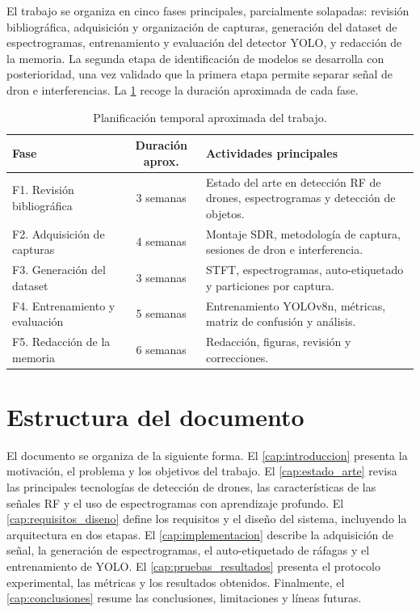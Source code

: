 El trabajo se organiza en cinco fases principales, parcialmente solapadas: revisión bibliográfica, adquisición y organización de capturas, generación del dataset de espectrogramas, entrenamiento y evaluación del detector YOLO, y redacción de la memoria. La segunda etapa de identificación de modelos se desarrolla con posterioridad, una vez validado que la primera etapa permite separar señal de dron e interferencias. La \cref{tab:planificacion} recoge la duración aproximada de cada fase.

\begin{table}[htbp]
\centering
\caption{Planificación temporal aproximada del trabajo.}
\label{tab:planificacion}
\begin{tabularx}{\textwidth}{lcX}
\toprule
\textbf{Fase} & \textbf{Duración aprox.} & \textbf{Actividades principales} \\
\midrule
F1. Revisión bibliográfica & 3 semanas & Estado del arte en detección RF de drones, espectrogramas y detección de objetos. \\
F2. Adquisición de capturas & 4 semanas & Montaje SDR, metodología de captura, sesiones de dron e interferencia. \\
F3. Generación del dataset & 3 semanas & STFT, espectrogramas, auto-etiquetado y particiones por captura. \\
F4. Entrenamiento y evaluación & 5 semanas & Entrenamiento YOLOv8n, métricas, matriz de confusión y análisis. \\
F5. Redacción de la memoria & 6 semanas & Redacción, figuras, revisión y correcciones. \\
\bottomrule
\end{tabularx}
\end{table}

\section{Estructura del documento}
\label{sec:estructura}

El documento se organiza de la siguiente forma. El \cref{cap:introduccion} presenta la motivación, el problema y los objetivos del trabajo. El \cref{cap:estado_arte} revisa las principales tecnologías de detección de drones, las características de las señales RF y el uso de espectrogramas con aprendizaje profundo. El \cref{cap:requisitos_diseno} define los requisitos y el diseño del sistema, incluyendo la arquitectura en dos etapas. El \cref{cap:implementacion} describe la adquisición de señal, la generación de espectrogramas, el auto-etiquetado de ráfagas y el entrenamiento de YOLO. El \cref{cap:pruebas_resultados} presenta el protocolo experimental, las métricas y los resultados obtenidos. Finalmente, el \cref{cap:conclusiones} resume las conclusiones, limitaciones y líneas futuras.
